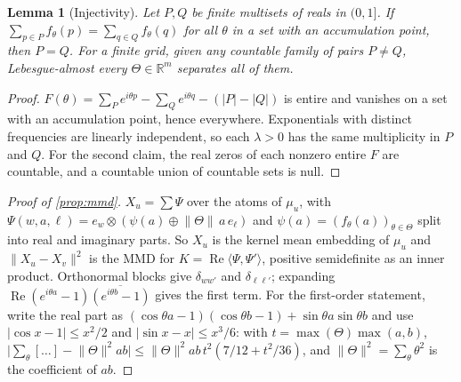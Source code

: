 \documentclass[10pt]{article}
\newtheorem{lemma}{Lemma}
\theoremstyle{definition}
\newcommand{\R}{\mathbb{R}}
\newcommand{\Th}{\Theta}
\newcommand{\nTh}{\lVert\Theta\rVert}
\begin{document}
\begin{lemma}[Injectivity]\label{lem:inj}
Let $P,Q$ be finite multisets of reals in $(0,1]$. If $\sum_{p\in P}f_\theta(p) = \sum_{q\in Q}f_\theta(q)$ for all $\theta$ in a set with an accumulation point, then $P=Q$. For a finite grid, given any countable family of pairs $P\ne Q$, Lebesgue-almost every $\Th\in\R^m$ separates all of them.
\end{lemma}
\begin{proof}
$F(\theta) = \sum_P e^{i\theta p} - \sum_Q e^{i\theta q} - (|P|-|Q|)$ is entire and vanishes on a set with an accumulation point, hence everywhere. Exponentials with distinct frequencies are linearly independent, so each $\lambda>0$ has the same multiplicity in $P$ and $Q$. For the second claim, the real zeros of each nonzero entire $F$ are countable, and a countable union of countable sets is null.
\end{proof}

\begin{proof}[Proof of \cref{prop:mmd}]
$X_u = \sum\Psi$ over the atoms of $\mu_u$, with $\Psi(w,a,\ell) = e_w\otimes(\psi(a)\oplus\nTh\,a\,e_\ell)$ and $\psi(a) = (f_\theta(a))_{\theta\in\Th}$ split into real and imaginary parts. So $X_u$ is the kernel mean embedding of $\mu_u$ and $\lVert X_u-X_v\rVert^2$ is the MMD for $K = \operatorname{Re}\langle\Psi,\Psi'\rangle$, positive semidefinite as an inner product. Orthonormal blocks give $\delta_{ww'}$ and $\delta_{\ell\ell'}$; expanding $\operatorname{Re}(e^{i\theta a}-1)\overline{(e^{i\theta b}-1)}$ gives the first term.
For the first-order statement, write the real part as $(\cos\theta a-1)(\cos\theta b-1)+\sin\theta a\sin\theta b$ and use $|\cos x-1|\le x^2/2$ and $|\sin x - x|\le x^3/6$: with $t = \max(\Th)\max(a,b)$,
$\big|\sum_\theta[\dots] - \nTh^2ab\big| \le \nTh^2 ab\, t^2(7/12 + t^2/36)$, and $\nTh^2=\sum_\theta\theta^2$ is the coefficient of $ab$.
\end{proof}
\end{document}
